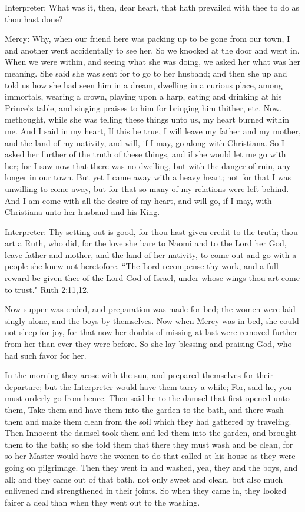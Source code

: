 Interpreter: What was it, then, dear heart, that hath prevailed with thee to do as thou hast done?

Mercy: Why, when our friend here was packing up to be gone from our town, I and another went accidentally to see her. So we knocked at the door and went in. When we were within, and seeing what she was doing, we asked her what was her meaning. She said she was sent for to go to her husband; and then she up and told us how she had seen him in a dream, dwelling in a curious place, among immortals, wearing a crown, playing upon a harp, eating and drinking at his Prince's table, and singing praises to him for bringing him thither, etc. Now, methought, while she was telling these things unto us, my heart burned within me. And I said in my heart, If this be true, I will leave my father and my mother, and the land of my nativity, and will, if I may, go along with Christiana. So I asked her further of the truth of these things, and if she would let me go with her; for I saw now that there was no dwelling, but with the danger of ruin, any longer in our town. But yet I came away with a heavy heart; not for that I was unwilling to come away, but for that so many of my relations were left behind. And I am come with all the desire of my heart, and will go, if I may, with Christiana unto her husband and his King.

Interpreter: Thy setting out is good, for thou hast given credit to the truth; thou art a Ruth, who did, for the love she bare to Naomi and to the Lord her God, leave father and mother, and the land of her nativity, to come out and go with a people she knew not heretofore. ``The Lord recompense thy work, and a full reward be given thee of the Lord God of Israel, under whose wings thou art come to trust." Ruth 2:11,12.

Now supper was ended, and preparation was made for bed; the women were laid singly alone, and the boys by themselves. Now when Mercy was in bed, she could not sleep for joy, for that now her doubts of missing at last were removed further from her than ever they were before. So she lay blessing and praising God, who had such favor for her.

In the morning they arose with the sun, and prepared themselves for their departure; but the Interpreter would have them tarry a while; For, said he, you must orderly go from hence. Then said he to the damsel that first opened unto them, Take them and have them into the garden to the bath, and there wash them and make them clean from the soil which they had gathered by traveling. Then Innocent the damsel took them and led them into the garden, and brought them to the bath; so she told them that there they must wash and be clean, for so her Master would have the women to do that called at his house as they were going on pilgrimage. Then they went in and washed, yea, they and the boys, and all; and they came out of that bath, not only sweet and clean, but also much enlivened and strengthened in their joints. So when they came in, they looked fairer a deal than when they went out to the washing.

